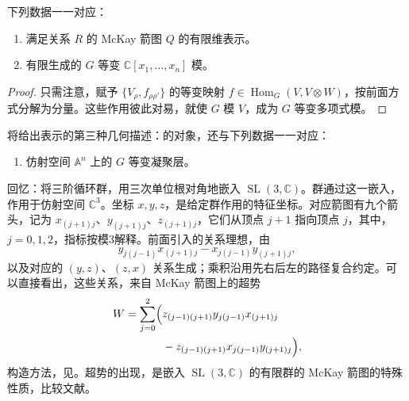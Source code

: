 \begin{proposition}\label{prop:4.37}
下列数据一一对应：
\begin{enumerate}[label=(\arabic*)]
\item 满足关系 $R$ 的 McKay 箭图 $Q$ 的有限维表示。
\item 有限生成的 $G$ 等变 $\mathbb{C}[x_1,\ldots,x_n]$ 模。
\end{enumerate}
\end{proposition}
\begin{proof}
只需注意，赋予 $\{V_\rho,f_{\rho\rho'}\}$ 的等变映射 $f\in\operatorname{Hom}_G(V,V\otimes W)$，按前面方式分解为分量。这些作用彼此对易，就使 $G$ 模 $V$，成为 $G$ 等变多项式模。\BookQED
\end{proof}

\begin{note}[38]\label{note:4.38}
将给出表示的第三种几何描述：的对象，还与下列数据一一对应：
\begin{enumerate}[label=(\arabic*),start=3]
\item 仿射空间 $\mathbb{A}^n$ 上的 $G$ 等变凝聚层。
\end{enumerate}
\end{note}

\begin{example}\label{ex:4.39}
回忆：将三阶循环群，用三次单位根对角地嵌入 $\operatorname{SL}(3,\mathbb{C})$。群通过这一嵌入，作用于仿射空间 $\mathbb{C}^3$。坐标 $x,y,z$，是给定群作用的特征坐标。对应箭图有九个箭头，记为 $x_{(j+1)j}$、$y_{(j+1)j}$、$z_{(j+1)j}$，它们从顶点 $j+1$ 指向顶点 $j$，其中，$j=0,1,2$，指标按模3解释。前面引入的关系理想，由
\[
y_{j(j-1)}x_{(j+1)j}-x_{j(j-1)}y_{(j+1)j},
\]
以及对应的 $(y,z)$、$(z,x)$ 关系生成；乘积沿用先右后左的路径复合约定。可以直接看出，这些关系，来自 McKay 箭图上的超势
\[
\begin{aligned}
W=\sum_{j=0}^2\Bigl(&z_{(j-1)(j+1)}y_{j(j-1)}x_{(j+1)j}\\
&-z_{(j-1)(j+1)}x_{j(j-1)}y_{(j+1)j}\Bigr),
\end{aligned}
\]
构造方法，见。超势的出现，是嵌入 $\operatorname{SL}(3,\mathbb{C})$ 的有限群的 McKay 箭图的特殊性质，比较文献。
\end{example}

